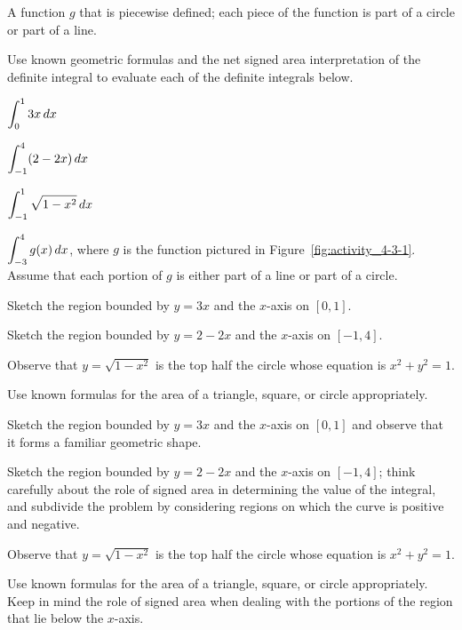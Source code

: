 \begin{marginfigure}[6cm] %
\caption{A function $g$ that is piecewise defined; each piece of the function is part of a circle or part of a line.} \label{fig:activity_4-3-1}
\end{marginfigure}

\begin{activity} \label{A:4.3.1}  Use known geometric formulas and the net signed area interpretation of the definite integral to evaluate each of the definite integrals below.
\ba
	\item $\displaystyle \int_0^1 3x \, dx$
	\item $\displaystyle \int_{-1}^4 (2-2x) \, dx$
	\item $\displaystyle \int_{-1}^1 \sqrt{1-x^2} \, dx$
	\item $\displaystyle \int_{-3}^4 g(x) \, dx$, where $g$ is the function pictured in Figure~\ref{fig:activity_4-3-1}.  Assume that each portion of $g$ is either part of a line or part of a circle.
\ea
\end{activity}
\begin{smallhint}
\ba
	\item Sketch the region bounded by $y = 3x$ and the $x$-axis on $[0,1]$.
	\item Sketch the region bounded by $y = 2-2x$ and the $x$-axis on $[-1,4]$.
	\item Observe that $y = \sqrt{1-x^2}$ is the top half the circle whose equation is $x^2 + y^2 = 1$.
	\item Use known formulas for the area of a triangle, square, or circle appropriately.
\ea
\end{smallhint}
\begin{bighint}
\ba
	\item Sketch the region bounded by $y = 3x$ and the $x$-axis on $[0,1]$ and observe that it forms a familiar geometric shape.
	\item Sketch the region bounded by $y = 2-2x$ and the $x$-axis on $[-1,4]$; think carefully about the role of signed area in determining the value of the integral, and subdivide the problem by considering regions on which the curve is positive and negative.
	\item Observe that $y = \sqrt{1-x^2}$ is the top half the circle whose equation is $x^2 + y^2 = 1$.
	\item Use known formulas for the area of a triangle, square, or circle appropriately.  Keep in mind the role of signed area when dealing with the portions of the region that lie below the $x$-axis.
\ea
\end{bighint}
